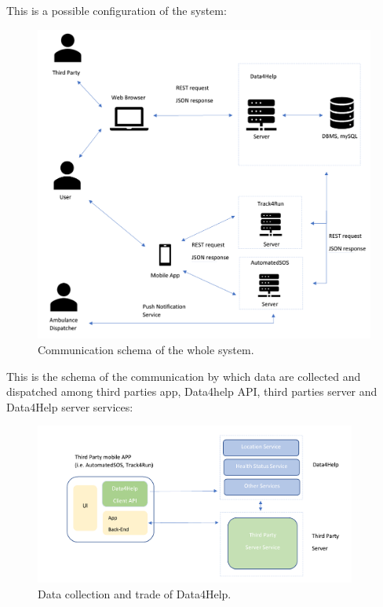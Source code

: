 \documentclass[a4paper]{article}
\begin{document}
This is a possible configuration of the system:
\begin{figure}[H]
    \centering
    \includegraphics[width=\textwidth]{communicationInterfaces1}
    \caption{Communication schema of the whole system.}
    \label{fig:my_label}
\end{figure}

This is the schema of the communication by which data are collected and dispatched among third parties app, Data4help API, third parties server and Data4Help server services:

\begin{figure}[H]
    \centering
    \includegraphics[height=150pt]{communicationInterfaces2}
    \caption{Data collection and trade of Data4Help.}
    \label{fig:my_label}
\end{figure}

\clearpage
\end{document}
